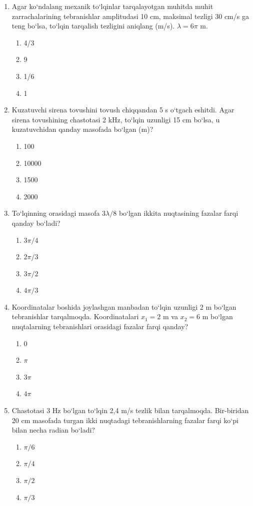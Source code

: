 \begin{enumerate}
\begin{enumerate}[label=\Alph*)]
\end{enumerate}

\item Agar ko‘ndalang mexanik to‘lqinlar tarqalayotgan muhitda muhit zarrachalarining tebranishlar amplitudasi 10 cm, maksimal tezligi 30 cm/s ga teng bo‘lsa, to‘lqin tarqalish tezligini aniqlang (m/s). $\lambda = 6\pi$ m.
\begin{enumerate}[label=\Alph*)]
\item 4/3
\item 9
\item 1/6
\item 1

\end{enumerate}

\item Kuzatuvchi sirena tovushini tovush chiqqandan 5 s o‘tgach eshitdi. Agar sirena tovushining chastotasi 2 kHz, to‘lqin uzunligi 15 cm bo‘lsa, u kuzatuvchidan qanday masofada bo‘lgan (m)?
\begin{enumerate}[label=\Alph*)]
\item 100
\item 10000
\item 1500
\item 2000
\end{enumerate}

\item To‘lqinning orasidagi masofa $3\lambda/8$ bo‘lgan ikkita nuqtasining fazalar farqi qanday bo‘ladi?
\begin{enumerate}[label=\Alph*)]
\item $3\pi/4$
\item $2\pi/3$
\item $3\pi/2$
\item $4\pi/3$
\end{enumerate}

\item Koordinatalar boshida joylashgan manbadan to‘lqin uzunligi 2 m bo‘lgan tebranishlar tarqalmoqda. Koordinatalari $x_1=2$ m va $x_2=6$ m bo‘lgan nuqtalarning tebranishlari orasidagi fazalar farqi qanday?
\begin{enumerate}[label=\Alph*)]
\item 0
\item $\pi$
\item $3\pi$
\item $4\pi$
\end{enumerate}

\item Chastotasi 3 Hz bo‘lgan to‘lqin 2,4 m/s tezlik bilan tarqalmoqda. Bir-biridan 20 cm masofada turgan ikki nuqtadagi tebranishlarning fazalar farqi ko‘pi bilan necha radian bo‘ladi?
\begin{enumerate}[label=\Alph*)]
\item $\pi/6$
\item $\pi/4$
\item $\pi/2$
\item $\pi/3$
\end{enumerate}


\end{enumerate}
